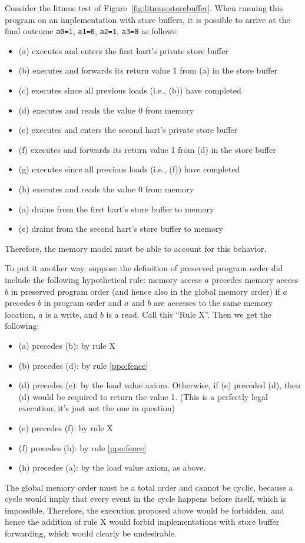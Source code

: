 Consider the litmus test of Figure~\ref{fig:litmus:storebuffer}.
When running this program on an implementation with store buffers, it is possible to arrive at the final outcome
{\tt a0=1}, {\tt a1=0}, {\tt a2=1}, {\tt a3=0}
as follows:
\begin{itemize}
  \item (a) executes and enters the first hart's private store buffer
  \item (b) executes and forwards its return value 1 from (a) in the store buffer
  \item (c) executes since all previous loads (i.e., (b)) have completed
  \item (d) executes and reads the value 0 from memory
  \item (e) executes and enters the second hart's private store buffer
  \item (f) executes and forwards its return value 1 from (d) in the store buffer
  \item (g) executes since all previous loads (i.e., (f)) have completed
  \item (h) executes and reads the value 0 from memory
  \item (a) drains from the first hart's store buffer to memory
  \item (e) drains from the second hart's store buffer to memory
\end{itemize}
Therefore, the memory model must be able to account for this behavior.

To put it another way, suppose the definition of preserved program order did include the following hypothetical rule:
memory access $a$ precedes memory access $b$ in preserved program order (and hence also in the global memory order) if $a$ precedes $b$ in program order and $a$ and $b$ are accesses to the same memory location, $a$ is a write, and $b$ is a read.  Call this ``Rule X''.  Then we get the following:

\begin{itemize}
  \item (a) precedes (b): by rule X
  \item (b) precedes (d): by rule \ref{ppo:fence}
  \item (d) precedes (e): by the load value axiom.  Otherwise, if (e) preceded (d), then (d) would be required to return the value 1.  (This is a perfectly legal execution; it's just not the one in question)
  \item (e) precedes (f): by rule X
  \item (f) precedes (h): by rule \ref{ppo:fence}
  \item (h) precedes (a): by the load value axiom, as above.
\end{itemize}
The global memory order must be a total order and cannot be cyclic, because a cycle would imply that every event in the cycle happens before itself, which is impossible.
Therefore, the execution proposed above would be forbidden, and hence the addition of rule X would forbid implementations with store buffer forwarding, which would clearly be undesirable.

